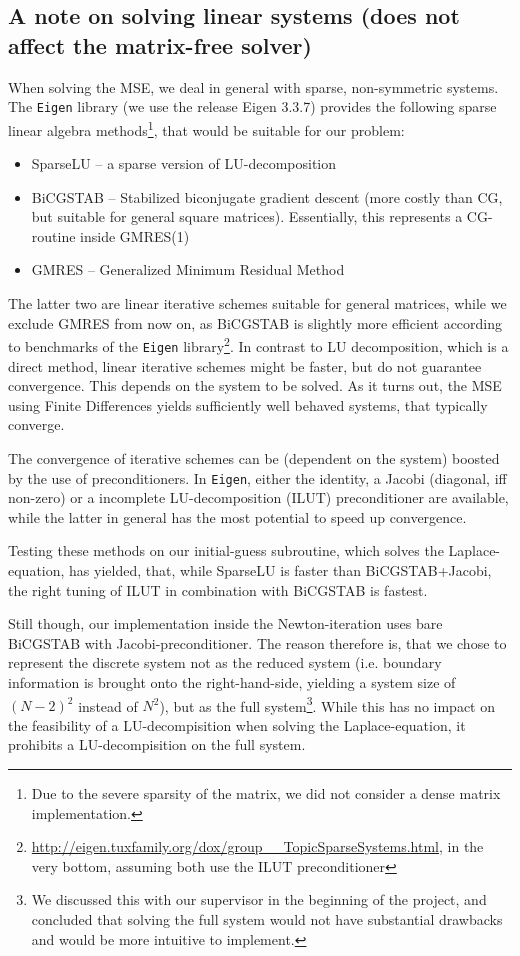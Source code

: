 \documentclass[11pt]{scrartcl}
\begin{document}
\subsection[A note on solving linear systems]{A note on solving linear systems (does not affect the matrix-free solver)}
When solving the MSE, we deal in general with sparse, non-symmetric systems. The \texttt{Eigen} library (we use the release Eigen 3.3.7) provides the following sparse linear algebra methods\footnote{Due to the severe sparsity of the matrix, we did not consider a dense matrix implementation.}, that would be suitable for our problem:
\begin{itemize}
	\item SparseLU -- a sparse version of LU-decomposition 
	\item BiCGSTAB -- Stabilized biconjugate gradient descent (more costly than CG, but suitable for general square matrices). Essentially, this represents a CG-routine inside GMRES(1)
	\item GMRES -- Generalized Minimum Residual Method 
\end{itemize}
The latter two are linear iterative schemes suitable for general matrices, while we exclude GMRES from now on, as BiCGSTAB is slightly more efficient according to benchmarks of the \texttt{Eigen} library\footnote{\url{http://eigen.tuxfamily.org/dox/group__TopicSparseSystems.html}, in the very bottom, assuming both use the ILUT preconditioner}. In contrast to LU decomposition, which is a direct method, linear iterative schemes might be faster, but do not guarantee convergence. This depends on the system to be solved. As it turns out, the MSE using Finite Differences yields sufficiently well behaved systems, that typically converge.

The convergence of iterative schemes can be (dependent on the system) boosted by the use of preconditioners. In \texttt{Eigen}, either the identity, a Jacobi (diagonal, iff non-zero) or a incomplete LU-decomposition (ILUT) preconditioner are available, while the latter in general has the most potential to speed up convergence. 

Testing these methods on our initial-guess subroutine, which solves the Laplace-equation, has yielded, that, while SparseLU is faster than BiCGSTAB+Jacobi, the right tuning of ILUT in combination with BiCGSTAB is fastest. 

Still though, our implementation inside the Newton-iteration uses bare BiCGSTAB with Jacobi-preconditioner. The reason therefore is, that we chose to represent the discrete system not as the reduced system (i.e. boundary information is brought onto the right-hand-side, yielding a system size of $(N-2)^2$ instead of $N^2$), but as the full system\footnote{We discussed this with our supervisor in the beginning of the project, and concluded that solving the full system would not have substantial drawbacks and would be more intuitive to implement.}. While this has no impact on the feasibility of a LU-decompisition when solving the Laplace-equation, it prohibits a LU-decompisition on the full system. 
\end{document}
